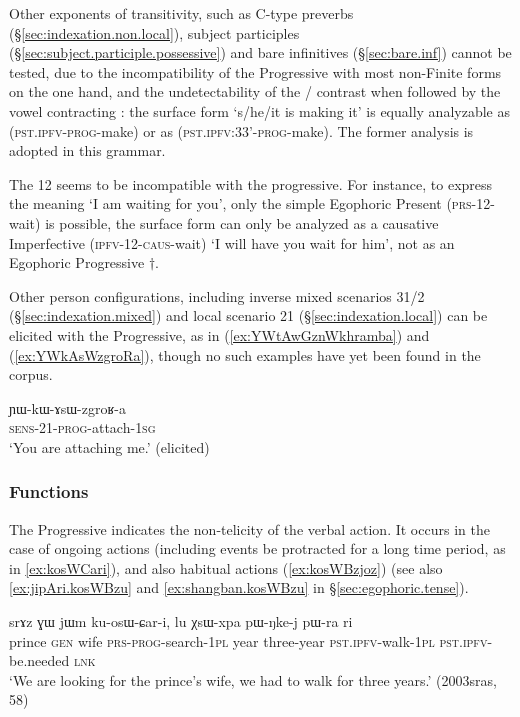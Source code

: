 Other exponents of transitivity, such as C-type preverbs (§\ref{sec:indexation.non.local}), subject participles (§\ref{sec:subject.participle.possessive}) and bare infinitives (§\ref{sec:bare.inf}) cannot be tested, due to the incompatibility of the Progressive with most non-Finite forms on the one hand, and the undetectability of the / contrast when followed by the vowel contracting : the surface form  `s/he/it is making it' is equally analyzable as  (\textsc{pst}.\textsc{ipfv}-\textsc{prog}-make) or as  (\textsc{pst}.\textsc{ipfv}:3\fl{}3'-\textsc{prog}-make). The former analysis is adopted in this grammar.

The 1\fl{}2  seems to be incompatible with the progressive. For instance, to express the meaning `I am waiting for you', only the simple Egophoric Present  (\textsc{prs}-1\fl{}2-wait) is possible, the surface form  can only be analyzed as a causative Imperfective  (\textsc{ipfv}-1\fl{}2-\textsc{caus}-wait) `I will have you wait for him', not as an Egophoric Progressive $\dagger$.

Other person configurations, including inverse mixed scenarios 3\fl{}1/2 (§\ref{sec:indexation.mixed}) and local scenario 2\fl{}1 (§\ref{sec:indexation.local}) can be elicited with the Progressive, as in (\ref{ex:YWtAwGznWkhramba}) and (\ref{ex:YWkAsWzgroRa}), though no such examples have yet been found in the corpus.

\begin{exe}
\ex \label{ex:YWkAsWzgroRa}
\gll ɲɯ-kɯ-ɤsɯ-zgroʁ-a \\
\textsc{sens}-2\fl{}1-\textsc{prog}-attach-\textsc{1sg} \\
\glt `You are attaching me.' (elicited)
 \end{exe}
 
\subsubsection{Functions} \label{sec:progressive.function}
The Progressive indicates the non-telicity of the verbal action. It occurs in the case of ongoing actions (including events be protracted for a long time period, as in \ref{ex:kosWCari}), and also habitual actions (\ref{ex:kosWBzjoz}) (see also \ref{ex:jipAri.kosWBzu} and \ref{ex:shangban.kosWBzu} in §\ref{sec:egophoric.tense}).

\begin{exe}
\ex \label{ex:kosWCari}
\gll srɤz ɣɯ jɯm ku-osɯ-ɕar-i, lu χsɯ-xpa pɯ-ŋke-j pɯ-ra ri  \\
prince \textsc{gen} wife \textsc{prs}-\textsc{prog}-search-\textsc{1pl} year three-year \textsc{pst}.\textsc{ipfv}-walk-\textsc{1pl} \textsc{pst}.\textsc{ipfv}-be.needed \textsc{lnk} \\
\glt `We are looking for the prince's wife, we had to walk for three years.'  (2003sras, 58)
 \end{exe}
 
